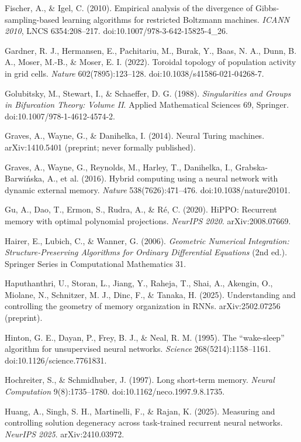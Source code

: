 \documentclass{article}
\begin{document}
{Fischer, A., \& Igel, C. (2010). Empirical analysis of the divergence of Gibbs-sampling-based learning algorithms for restricted Boltzmann machines. \emph{ICANN 2010}, LNCS 6354:208--217. doi:10.1007/978-3-642-15825-4\_26.\par
Gardner, R. J., Hermansen, E., Pachitariu, M., Burak, Y., Baas, N. A., Dunn, B. A., Moser, M.-B., \& Moser, E. I. (2022). Toroidal topology of population activity in grid cells. \emph{Nature} 602(7895):123--128. doi:10.1038/s41586-021-04268-7.\par
Golubitsky, M., Stewart, I., \& Schaeffer, D. G. (1988). \emph{Singularities and Groups in Bifurcation Theory: Volume II}. Applied Mathematical Sciences 69, Springer. doi:10.1007/978-1-4612-4574-2.\par
Graves, A., Wayne, G., \& Danihelka, I. (2014). Neural Turing machines. arXiv:1410.5401 (preprint; never formally published).\par
Graves, A., Wayne, G., Reynolds, M., Harley, T., Danihelka, I., Grabska-Barwi\'nska, A., et al. (2016). Hybrid computing using a neural network with dynamic external memory. \emph{Nature} 538(7626):471--476. doi:10.1038/nature20101.\par
Gu, A., Dao, T., Ermon, S., Rudra, A., \& R\'e, C. (2020). HiPPO: Recurrent memory with optimal polynomial projections. \emph{NeurIPS 2020}. arXiv:2008.07669.\par
Hairer, E., Lubich, C., \& Wanner, G. (2006). \emph{Geometric Numerical Integration: Structure-Preserving Algorithms for Ordinary Differential Equations} (2nd ed.). Springer Series in Computational Mathematics 31.\par
Haputhanthri, U., Storan, L., Jiang, Y., Raheja, T., Shai, A., Akengin, O., Miolane, N., Schnitzer, M. J., Dinc, F., \& Tanaka, H. (2025). Understanding and controlling the geometry of memory organization in RNNs. arXiv:2502.07256 (preprint).\par
Hinton, G. E., Dayan, P., Frey, B. J., \& Neal, R. M. (1995). The ``wake-sleep'' algorithm for unsupervised neural networks. \emph{Science} 268(5214):1158--1161. doi:10.1126/science.7761831.\par
Hochreiter, S., \& Schmidhuber, J. (1997). Long short-term memory. \emph{Neural Computation} 9(8):1735--1780. doi:10.1162/neco.1997.9.8.1735.\par
Huang, A., Singh, S. H., Martinelli, F., \& Rajan, K. (2025). Measuring and controlling solution degeneracy across task-trained recurrent neural networks. \emph{NeurIPS 2025}. arXiv:2410.03972.\par
}
\end{document}
